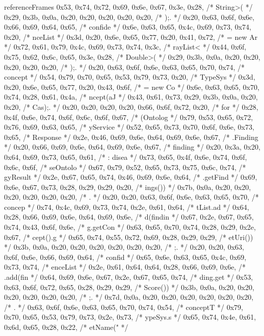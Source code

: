 \begin{chunk}{referenceFrames}
{{{{{0x53, 0x74, 0x72, 0x69, 0x6e, 0x67, 0x3e, 0x28, /* String>( */
0x29, 0x3b, 0x0a, 0x20, 0x20, 0x20, 0x20, 0x20, /* );.      */
0x20, 0x63, 0x6f, 0x6e, 0x66, 0x69, 0x64, 0x65, /*  confide */
0x6e, 0x63, 0x65, 0x4c, 0x69, 0x73, 0x74, 0x20, /* nceList  */
0x3d, 0x20, 0x6e, 0x65, 0x77, 0x20, 0x41, 0x72, /* = new Ar */
0x72, 0x61, 0x79, 0x4c, 0x69, 0x73, 0x74, 0x3c, /* rayList< */
0x44, 0x6f, 0x75, 0x62, 0x6c, 0x65, 0x3e, 0x28, /* Double>( */
0x29, 0x3b, 0x0a, 0x20, 0x20, 0x20, 0x20, 0x20, /* );.      */
0x20, 0x63, 0x6f, 0x6e, 0x63, 0x65, 0x70, 0x74, /*  concept */
0x54, 0x79, 0x70, 0x65, 0x53, 0x79, 0x73, 0x20, /* TypeSys  */
0x3d, 0x20, 0x6e, 0x65, 0x77, 0x20, 0x43, 0x6f, /* = new Co */
0x6e, 0x63, 0x65, 0x70, 0x74, 0x28, 0x61, 0x4a, /* ncept(aJ */
0x43, 0x61, 0x73, 0x29, 0x3b, 0x0a, 0x20, 0x20, /* Cas);.   */
0x20, 0x20, 0x20, 0x20, 0x66, 0x6f, 0x72, 0x20, /*     for  */
0x28, 0x4f, 0x6e, 0x74, 0x6f, 0x6c, 0x6f, 0x67, /* (Ontolog */
0x79, 0x53, 0x65, 0x72, 0x76, 0x69, 0x63, 0x65, /* yService */
0x52, 0x65, 0x73, 0x70, 0x6f, 0x6e, 0x73, 0x65, /* Response */
0x2e, 0x46, 0x69, 0x6e, 0x64, 0x69, 0x6e, 0x67, /* .Finding */
0x20, 0x66, 0x69, 0x6e, 0x64, 0x69, 0x6e, 0x67, /*  finding */
0x20, 0x3a, 0x20, 0x64, 0x69, 0x73, 0x65, 0x61, /*  : disea */
0x73, 0x65, 0x4f, 0x6e, 0x74, 0x6f, 0x6c, 0x6f, /* seOntolo */
0x67, 0x79, 0x52, 0x65, 0x73, 0x75, 0x6c, 0x74, /* gyResult */
0x2e, 0x67, 0x65, 0x74, 0x46, 0x69, 0x6e, 0x64, /* .getFind */
0x69, 0x6e, 0x67, 0x73, 0x28, 0x29, 0x29, 0x20, /* ings())  */
0x7b, 0x0a, 0x20, 0x20, 0x20, 0x20, 0x20, 0x20, /* {.       */
0x20, 0x20, 0x63, 0x6f, 0x6e, 0x63, 0x65, 0x70, /*   concep */
0x74, 0x4c, 0x69, 0x73, 0x74, 0x2e, 0x61, 0x64, /* tList.ad */
0x64, 0x28, 0x66, 0x69, 0x6e, 0x64, 0x69, 0x6e, /* d(findin */
0x67, 0x2e, 0x67, 0x65, 0x74, 0x43, 0x6f, 0x6e, /* g.getCon */
0x63, 0x65, 0x70, 0x74, 0x28, 0x29, 0x2e, 0x67, /* cept().g */
0x65, 0x74, 0x55, 0x72, 0x69, 0x28, 0x29, 0x29, /* etUri()) */
0x3b, 0x0a, 0x20, 0x20, 0x20, 0x20, 0x20, 0x20, /* ;.       */
0x20, 0x20, 0x63, 0x6f, 0x6e, 0x66, 0x69, 0x64, /*   confid */
0x65, 0x6e, 0x63, 0x65, 0x4c, 0x69, 0x73, 0x74, /* enceList */
0x2e, 0x61, 0x64, 0x64, 0x28, 0x66, 0x69, 0x6e, /* .add(fin */
0x64, 0x69, 0x6e, 0x67, 0x2e, 0x67, 0x65, 0x74, /* ding.get */
0x53, 0x63, 0x6f, 0x72, 0x65, 0x28, 0x29, 0x29, /* Score()) */
0x3b, 0x0a, 0x20, 0x20, 0x20, 0x20, 0x20, 0x20, /* ;.       */
0x7d, 0x0a, 0x20, 0x20, 0x20, 0x20, 0x20, 0x20, /* }.       */
0x63, 0x6f, 0x6e, 0x63, 0x65, 0x70, 0x74, 0x54, /* conceptT */
0x79, 0x70, 0x65, 0x53, 0x79, 0x73, 0x2e, 0x73, /* ypeSys.s */
0x65, 0x74, 0x4e, 0x61, 0x6d, 0x65, 0x28, 0x22, /* etName(" */
}}}}}
\end{chunk}
